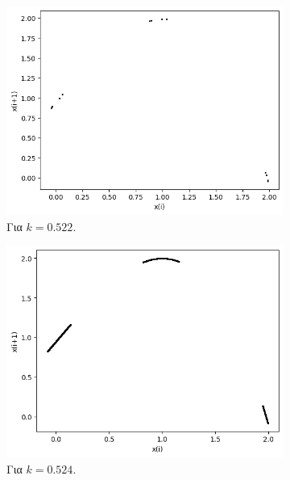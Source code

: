 \begin{figure}[h!]
	\centering
	\begin{subfigure}[c]{0.4\textwidth}
		\centering
		\includegraphics[width=\textwidth]{LateX images/graphs/k0522}
		\caption{Για $k=0.522$.}
		\label{f:k8}
	\end{subfigure}
	\hfill
	\begin{subfigure}[c]{0.4\textwidth}
		\centering
		\includegraphics[width=\textwidth]{LateX images/graphs/k0524}
		\caption{Για $k=0.524$.}
		\label{f:k9}
	\end{subfigure}
	\hfill
	\begin{subfigure}[c]{0.4\textwidth}
		\centering

\end{subfigure}
\end{figure}
